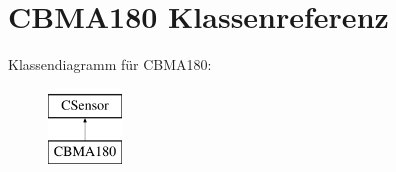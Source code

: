 \hypertarget{class_c_b_m_a180}{\section{\-C\-B\-M\-A180 \-Klassenreferenz}
\label{class_c_b_m_a180}
}
\-Klassendiagramm für \-C\-B\-M\-A180\-:\begin{figure}[H]
\begin{center}
\leavevmode
\includegraphics[height=2.000000cm]{class_c_b_m_a180}
\end{center}
\end{figure}
